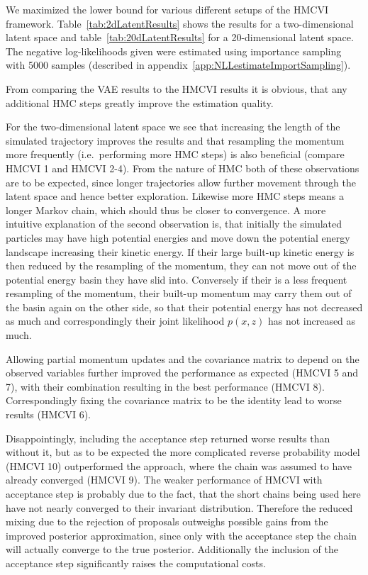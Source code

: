 We maximized the lower bound for various different setups of the HMCVI framework. Table~\ref{tab:2dLatentResults} shows the results for a two-dimensional latent space and table~\ref{tab:20dLatentResults} for a 20-dimensional latent space. The negative log-likelihoods given were estimated using importance sampling with 5000 samples (described in appendix~\ref{app:NLLestimateImportSampling}).

From comparing the VAE results to the HMCVI results it is obvious, that any additional HMC steps greatly improve the estimation quality. 

For the two-dimensional latent space we see that increasing the length of the simulated trajectory improves the results and that resampling the momentum more frequently (i.e.\ performing more HMC steps) is also beneficial (compare HMCVI 1 and HMCVI 2-4). From the nature of HMC both of these observations are to be expected, since longer trajectories allow further movement through the latent space and hence better exploration. Likewise more HMC steps means a longer Markov chain, which should thus be closer to convergence. A more intuitive explanation of the second observation is, that initially the simulated particles may have high potential energies and move down the potential energy landscape increasing their kinetic energy. If their large built-up kinetic energy is then reduced by the resampling of the momentum, they can not move out of the potential energy basin they have slid into. Conversely if their is a less frequent resampling of the momentum, their built-up momentum may carry them out of the basin again on the other side, so that their potential energy has not decreased as much and correspondingly their joint likelihood $p(x, z)$ has not increased as much. %

Allowing partial momentum updates and the covariance matrix to depend on the observed variables further improved the performance as expected (HMCVI 5 and 7), with their combination resulting in the best performance (HMCVI 8). Correspondingly fixing the covariance matrix to be the identity lead to worse results (HMCVI 6).

Disappointingly, including the acceptance step returned worse results than without it, but as to be expected the more complicated reverse probability model (HMCVI 10) outperformed the approach, where the chain was assumed to have already converged (HMCVI 9). The weaker performance of HMCVI with acceptance step is probably due to the fact, that the short chains being used here have not nearly converged to their invariant distribution. Therefore the reduced mixing due to the rejection of proposals outweighs possible gains from the improved posterior approximation, since only with the acceptance step the chain will actually converge to the true posterior. Additionally the inclusion of the acceptance step significantly raises the computational costs.
